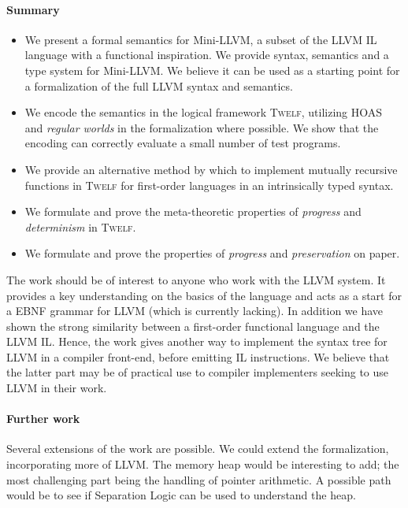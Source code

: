 \documentclass[a4paper, oneside, 10pt, draft]{memoir}
\newcommand{\twelf}{\textsc{Twelf}}
\begin{document}
\paragraph{Summary}
\begin{itemize}
\item We present a formal semantics for Mini-LLVM, a subset of the
  LLVM IL language with a functional inspiration. We provide syntax,
  semantics and a type system for Mini-LLVM. We believe it can be used
  as a starting point for a formalization of the full LLVM syntax and
  semantics.
\item We encode the semantics in the logical framework \twelf{},
  utilizing HOAS and \emph{regular worlds} in the formalization where
  possible. We show that the encoding can correctly evaluate a small
  number of test programs.
\item We provide an alternative method by which to implement mutually
  recursive functions in \twelf{} for first-order languages in an
  intrinsically typed syntax.
\item We formulate and prove the meta-theoretic properties of
  \emph{progress} and \emph{determinism} in \twelf{}.
\item We formulate and prove the properties of \emph{progress} and
  \emph{preservation} on paper.
\end{itemize}

The work should be of interest to anyone who work with the LLVM
system. It provides a key understanding on the basics of the language
and acts as a start for a EBNF grammar for LLVM (which is currently
lacking). In addition we have shown the strong similarity between a
first-order functional language and the LLVM IL. Hence, the work gives
another way to implement the syntax tree for LLVM in a compiler
front-end, before emitting IL instructions. We believe that the latter
part may be of practical use to compiler implementers seeking to use
LLVM in their work.

\paragraph{Further work}

Several extensions of the work are possible. We could extend the
formalization, incorporating more of LLVM. The memory heap would be
interesting to add; the most challenging part being the handling of
pointer arithmetic. A possible path would be to see if Separation
Logic\cite{reynolds:2002:separationlogic} can be used to understand
the heap.
\end{document}
